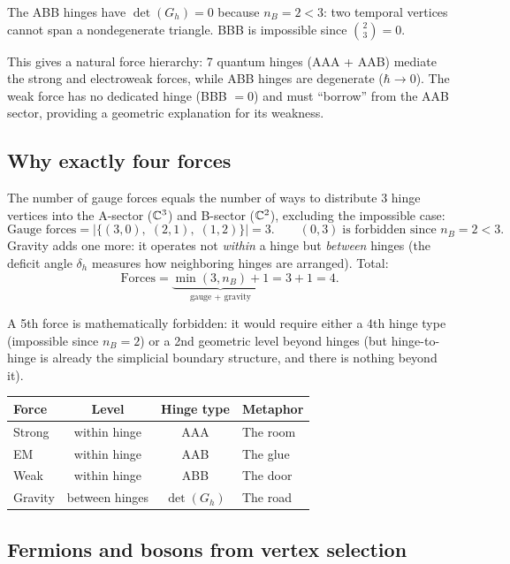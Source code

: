 The ABB hinges have $\det(G_h) = 0$ because $n_B = 2 < 3$: two temporal vertices cannot span a nondegenerate triangle. BBB is impossible since $\binom{2}{3} = 0$.

This gives a natural force hierarchy: 7 quantum hinges (AAA + AAB) mediate the strong and electroweak forces, while ABB hinges are degenerate ($\hbar \to 0$). The weak force has no dedicated hinge (BBB $= 0$) and must ``borrow'' from the AAB sector, providing a geometric explanation for its weakness.

\subsection{Why exactly four forces}

The number of gauge forces equals the number of ways to distribute 3 hinge vertices into the A-sector ($\mathbb{C}^3$) and B-sector ($\mathbb{C}^2$), excluding the impossible case:
\begin{equation}
\text{Gauge forces} = |\{(3,0),\;(2,1),\;(1,2)\}| = 3. \qquad (0,3)\;\text{is forbidden since } n_B = 2 < 3.
\end{equation}
Gravity adds one more: it operates not \emph{within} a hinge but \emph{between} hinges (the deficit angle $\delta_h$ measures how neighboring hinges are arranged). Total:
\begin{equation}
\text{Forces} = \underbrace{\min(3, n_B) + 1}_{\text{gauge + gravity}} = 3 + 1 = 4.
\end{equation}

A 5th force is mathematically forbidden: it would require either a 4th hinge type (impossible since $n_B = 2$) or a 2nd geometric level beyond hinges (but hinge-to-hinge is already the simplicial boundary structure, and there is nothing beyond it).

\begin{center}
\begin{tabular}{lccl}
\hline
Force & Level & Hinge type & Metaphor \\
\hline
Strong & within hinge & AAA & The room \\
EM & within hinge & AAB & The glue \\
Weak & within hinge & ABB & The door \\
Gravity & between hinges & $\det(G_h)$ & The road \\
\hline
\end{tabular}
\end{center}

\subsection{Fermions and bosons from vertex selection}
\label{sec:spin_statistics}

